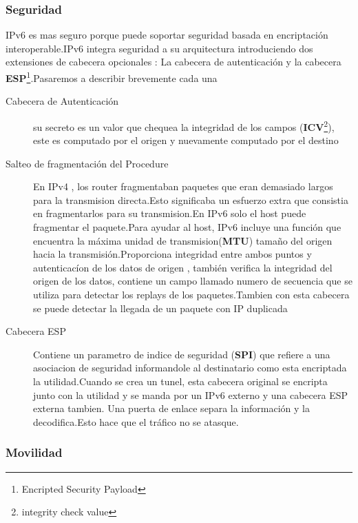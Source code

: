 \documentclass[11pt,a4paper]{article}
\begin{document}
\subsubsection{Seguridad}
IPv6 es mas seguro porque puede soportar seguridad basada en encriptación interoperable.IPv6 integra seguridad a su arquitectura introduciendo dos extensiones de cabecera opcionales : La cabecera de autenticación y la cabecera \textbf{ESP}\footnote{Encripted Security Payload}.Pasaremos a describir brevemente cada una 
\begin{description}
\item[Cabecera de Autenticación] su secreto es un valor que chequea la integridad de los campos (\textbf{ICV}\footnote{integrity check value}), este es computado por el origen y nuevamente computado por el destino
\item[Salteo de fragmentación del Procedure] En IPv4 , los router fragmentaban paquetes que eran demasiado largos para la transmision directa.Esto significaba un esfuerzo extra que consistia en fragmentarlos para su transmision.En IPv6 solo el host puede fragmentar el paquete.Para ayudar al host, IPv6 incluye una función que encuentra la máxima unidad de transmision(\textbf{MTU}) tamaño del origen hacia la transmisión.Proporciona integridad entre ambos puntos y autenticacíon de los datos de origen , también verifica la integridad del origen de los datos, contiene un campo llamado  numero de secuencia que se utiliza para detectar los replays de los paquetes.Tambien con esta cabecera se puede detectar la llegada de un paquete con IP duplicada
\item[Cabecera ESP] Contiene un parametro de indice de seguridad (\textbf{SPI}) que refiere a una asociacion de seguridad informandole al destinatario como esta encriptada la utilidad.Cuando se crea un tunel, esta  cabecera original se encripta junto con la utilidad y se manda por un IPv6 externo y una cabecera ESP externa tambien. Una puerta de enlace separa la información y la decodifica.Esto hace que el tráfico no se atasque.
\end {description}
\subsubsection{Movilidad}
\end{document}
